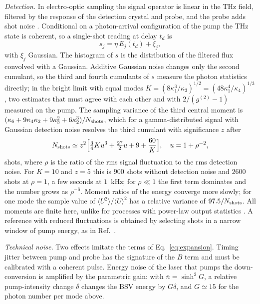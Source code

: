 \documentclass[aps,pra,reprint,superscriptaddress,amsmath,amssymb,floatfix]{revtex4-2}
\newcommand{\nbar}{\bar n}
\begin{document}
\emph{Detection.} In electro-optic sampling the signal operator is linear in
the THz field, filtered by the response of the detection crystal and probe,
and the probe adds shot noise \cite{moskalenko2015}. Conditional on a
photon-arrival configuration of the pump the THz state is coherent, so a
single-shot reading at delay $t_d$ is
\begin{equation}
s_j=\eta\,E_j(t_d)+\xi_j ,
\end{equation}
with $\xi_j$ Gaussian. The histogram of $s$ is the distribution of the
filtered flux convolved with a Gaussian. Additive Gaussian noise changes only
the second cumulant, so the third and fourth cumulants of $s$ measure the
photon statistics directly; in the bright limit with equal modes
$K=(8\kappa_1^3/\kappa_3)^{1/2}=(48\kappa_1^4/\kappa_4)^{1/3}$, two estimates
that must agree with each other and with $2/(g^{(2)}-1)$ measured on the
pump. The sampling variance of the third central moment is
$(\kappa_6+9\kappa_4\kappa_2+9\kappa_3^2+6\kappa_2^3)/N_{\rm shots}$, which
for a gamma-distributed signal with Gaussian detection noise resolves the
third cumulant with significance $z$ after
\begin{equation}
N_{\rm shots}\simeq z^2\Big[\tfrac{3}{4}K u^3+\tfrac{27}{2}u+9+\frac{60}{K}\Big],
\quad u=1+\rho^{-2},
\label{eq:shots}
\end{equation}
shots, where $\rho$ is the ratio of the rms signal fluctuation to the rms
detection noise. For $K=10$ and $z=5$ this is $900$ shots without detection
noise and $2600$ shots at $\rho=1$, a few seconds at $1$~kHz; for $\rho\ll1$
the first term dominates and the number grows as $\rho^{-6}$. Moment ratios
of the energy converge more slowly; for one mode the sample value of
$\langle U^2\rangle/\langle U\rangle^2$ has a relative variance of
$97.5/N_{\rm shots}$. All moments are finite here, unlike for processes with
power-law output statistics \cite{manceau2019,racz2020}. A reference with
reduced fluctuations is obtained by selecting shots in a narrow window of
pump energy, as in Ref.~\cite{spasibko2017}.

\emph{Technical noise.} Two effects imitate the terms of
Eq.~\eqref{eq:expansion}. Timing jitter between pump and probe has the
signature of the $B$ term and must be calibrated with a coherent pulse.
Energy noise of the laser that pumps the down-conversion is amplified by the
parametric gain: with $\nbar=\sinh^2G$, a relative pump-intensity change
$\delta$ changes the BSV energy by $G\delta$, and $G\simeq15$ for the
photon number per mode above.
\end{document}
